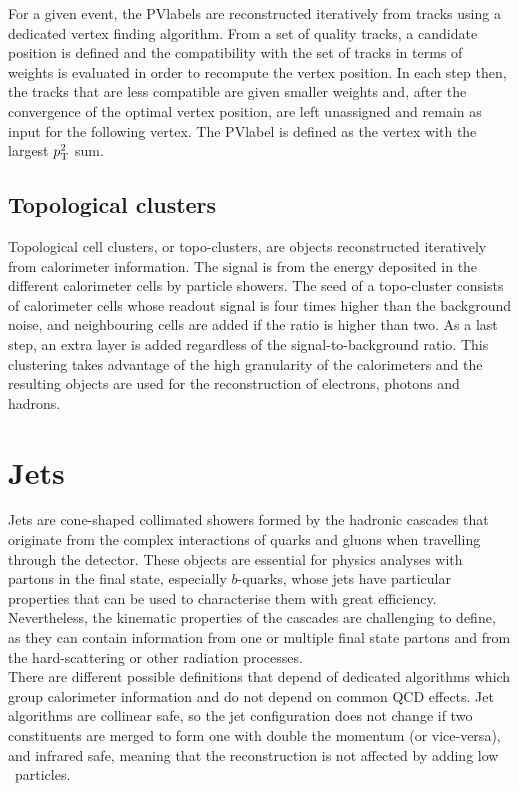 For a given event, the \acrshort{PVlabel}s are reconstructed iteratively from tracks using a dedicated vertex finding algorithm. From a set of quality tracks, a candidate position is defined and the compatibility with the set of tracks in terms of weights is evaluated in order to recompute the vertex position. In each step then, the tracks that are less compatible are given smaller weights and, after the convergence of the optimal vertex position, are left unassigned and remain as input for the following vertex. The \acrshort{PVlabel} is defined as the vertex with the largest $p_{\text{T}}^2$ sum. 

\subsection{Topological clusters}

Topological cell clusters, or topo-clusters, are objects reconstructed iteratively from calorimeter information. The signal is from the energy deposited in the different calorimeter cells by particle showers. The seed of a topo-cluster consists of calorimeter cells whose readout signal is four times higher than the background noise, and neighbouring cells are added if the ratio is higher than two. As a last step, an extra layer is added regardless of the signal-to-background ratio. This clustering takes advantage of the high granularity of the calorimeters and the resulting objects are used for the reconstruction of electrons, photons and hadrons.

\section{Jets}

Jets are cone-shaped collimated showers formed by the hadronic cascades that originate from the complex interactions of quarks and gluons when travelling through the detector. These objects are essential for physics analyses with partons in the final state, especially $b$-quarks, whose jets have particular properties that can be used to characterise them with great efficiency. Nevertheless, the kinematic properties of the cascades are challenging to define, as they can contain information from one or multiple final state partons and from the hard-scattering or other radiation processes.\\

There are different possible definitions that depend of dedicated algorithms which group calorimeter information and do not depend on common \acrshort{QCD} effects. Jet algorithms are collinear safe, so the jet configuration does not change if two constituents are merged to form one with double the momentum (or vice-versa), and infrared safe, meaning that the reconstruction is not affected by adding low \pT\ particles.

